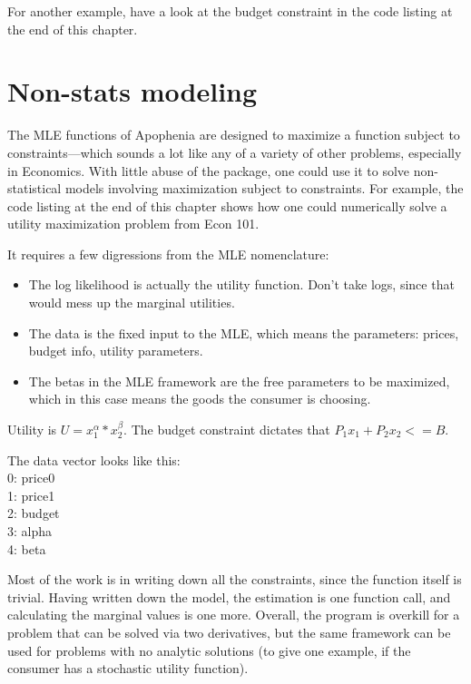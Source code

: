 For another example, have a look at the budget constraint in the code
listing at the end of this chapter.

\section{Non-stats modeling}    \label{econ101}

The MLE functions of Apophenia are designed to maximize a function
subject to constraints---which sounds a lot like any of a variety of
other problems, especially in Economics. With little abuse of the package,
one could use it to solve non-statistical models involving maximization
subject to constraints. For example, the code listing at the end of this
chapter shows how one could numerically solve a utility maximization
problem from Econ 101. 

It requires a few digressions from the MLE nomenclature:
\begin{itemize}
\item The log likelihood is actually the utility function. Don't take logs,
since that would mess up the marginal utilities.

\item The data is the fixed input to the MLE, which means the parameters:
prices, budget info, utility parameters.

\item The betas in the MLE framework are the free parameters to be
maximized, which in this case means the goods the consumer is choosing.
\end{itemize}

Utility is $U = x_1^\alpha * x_2^\beta$. 
The budget constraint dictates that $P_1 x_1 + P_2 x_2 <= B$.
                                                             
The data vector looks like this:\\
0:  price0\\
1:  price1\\
2:  budget \\
3:  alpha  \\
4:  beta   
                                                             
Most of the work is in writing down all the constraints, since the
function itself is trivial. Having written down the model, the estimation
is one function call, and calculating the marginal values is one more.
Overall, the program is overkill for a problem that can be solved via
two derivatives, but the same framework can be used for problems with no
analytic solutions (to give one example, if the consumer has a stochastic
utility function).

